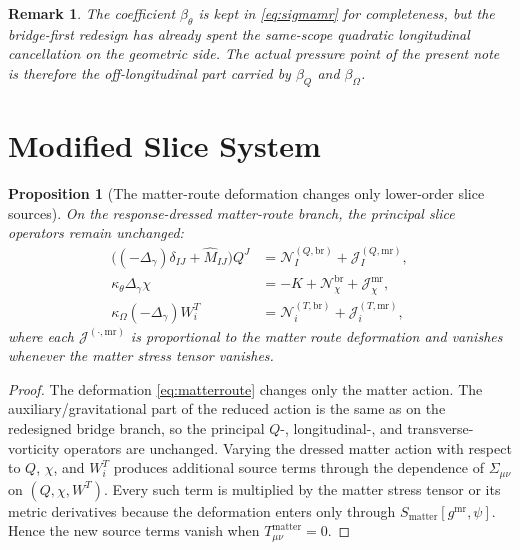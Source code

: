 \documentclass[11pt]{article}
\newcommand{\MatterMetric}{g^{\mathrm{mr}}}
\newcommand{\SigmaMR}{\Sigma}
\newtheorem{proposition}{Proposition}
\newtheorem{remark}{Remark}
\begin{document}
\begin{remark}
The coefficient \(\beta_\theta\) is kept in \eqref{eq:sigmamr} for completeness, but the bridge-first redesign has already spent the same-scope quadratic longitudinal cancellation on the geometric side. The actual pressure point of the present note is therefore the off-longitudinal part carried by \(\beta_Q\) and \(\beta_\Omega\).
\end{remark}

\section{Modified Slice System}

\begin{proposition}[The matter-route deformation changes only lower-order slice sources]
\label{prop:slice}
On the response-dressed matter-route branch, the principal slice operators remain unchanged:
\begin{align}
\bigl((-\Delta_\gamma)\delta_{IJ}+\widehat M_{IJ}\bigr)Q^J
&=
\mathcal N_I^{(Q,\mathrm{br})}
+\mathcal J_I^{(Q,\mathrm{mr})},
\label{eq:Qeq}
\\
\kappa_\theta\Delta_\gamma\chi
&=
-K+\mathcal N_\chi^{\mathrm{br}}
+\mathcal J_\chi^{\mathrm{mr}},
\label{eq:chieq}
\\
\kappa_\Omega(-\Delta_\gamma)W_i^T
&=
\mathcal N_i^{(T,\mathrm{br})}
+\mathcal J_i^{(T,\mathrm{mr})},
\label{eq:Weq}
\end{align}
where each \(\mathcal J^{(\cdot,\mathrm{mr})}\) is proportional to the matter route deformation and vanishes whenever the matter stress tensor vanishes.
\end{proposition}

\begin{proof}
The deformation \eqref{eq:matterroute} changes only the matter action. The auxiliary/gravitational part of the reduced action is the same as on the redesigned bridge branch, so the principal \(Q\)-, longitudinal-, and transverse-vorticity operators are unchanged. Varying the dressed matter action with respect to \(Q\), \(\chi\), and \(W_i^T\) produces additional source terms through the dependence of \(\SigmaMR_{\mu\nu}\) on \((Q,\chi,W^T)\). Every such term is multiplied by the matter stress tensor or its metric derivatives because the deformation enters only through \(S_{\mathrm{matter}}[\MatterMetric,\psi]\). Hence the new source terms vanish when \(T_{\mu\nu}^{\mathrm{matter}}=0\).
\end{proof}
\end{document}
